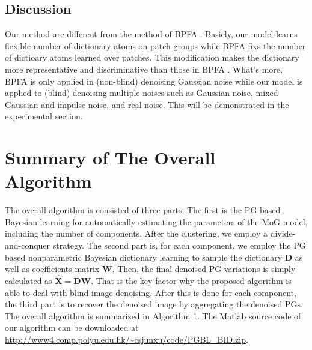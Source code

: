 \documentclass[runningheads]{llncs}
\begin{document}
\subsection{Discussion}
Our method are different from the method of BPFA \cite{bpfa}. Basicly, our model learns flexible number of dictionary atoms on patch groups while BPFA fixs the number of dictioary atoms learned over patches. This modification makes the dictionary more representative and discriminative than those in BPFA \cite{bpfa}. What's more, BPFA is only applied in (non-blind) denoising Gaussian noise while our model is applied to (blind) denoising multiple noises such as Gaussian noise, mixed Gaussian and impulse noise, and real noise. This will be demonstrated in the experimental section.

\section{Summary of The Overall Algorithm}
The overall algorithm is consisted of three parts. The first is the PG based Bayesian learning for automatically estimating the parameters of the MoG model, including the number of components. After the clustering, we employ a divide-and-conquer strategy. The second part is, for each component, we employ the PG based nonparametric Bayesian dictionary learning to sample the dictionary $\mathbf{D}$ as well as coefficients matrix $\mathbf{W}$. Then, the final denoised PG variations is simply calculated as $\hat{\mathbf{X}} = \mathbf{D}\mathbf{W}$. That is the key factor why the proposed algorithm is able to deal with blind image denoising. After this is done for each component, the third part is to recover the denoised image by aggregating the denoised PGs. The overall algorithm is summarized in Algorithm 1. The Matlab source code of our algorithm can be downloaded at \url{http://www4.comp.polyu.edu.hk/~csjunxu/code/PGBL_BID.zip}.
\end{document}
